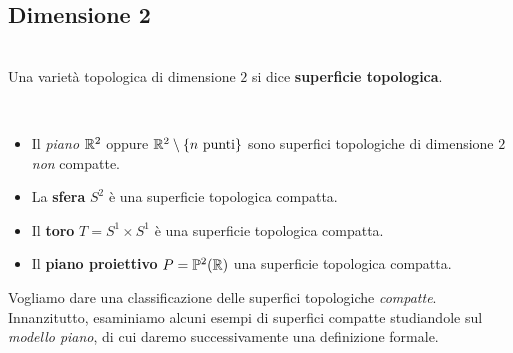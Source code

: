 	\subsection{Dimensione 2}
\begin{define}~{}\\
	Una varietà topologica di dimensione $2$ si dice \textbf{superficie topologica}.
\end{define}
\begin{examples}~{}
	\begin{itemize}
		\item Il \textit{piano} $\mathbb{R}^2$ oppure $\mathbb{R}^2\setminus \{n\text{ punti}\}$ sono superfici topologiche di dimensione $2$ \textit{non} compatte.
		\item La \textbf{sfera} $S^2$ è una superficie topologica compatta.
		\item Il \textbf{toro} $T=S^1\times S^1$ è una superficie topologica compatta.
		\item Il \textbf{piano proiettivo} $P=\mathbb{P}^2(\mathbb{R})$ una superficie topologica compatta.
	\end{itemize}
\vspace{-3mm}
\end{examples}
Vogliamo dare una classificazione delle superfici topologiche \textit{compatte}. Innanzitutto, esaminiamo alcuni esempi di superfici compatte studiandole sul \textit{modello piano}, di cui daremo successivamente una definizione formale.
